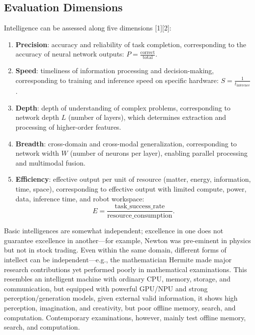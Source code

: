 \documentclass[12pt,a4paper]{article}
\begin{document}
\subsection{Evaluation Dimensions}
Intelligence can be assessed along five dimensions [1][2]:
\begin{enumerate}
\item \textbf{Precision}: accuracy and reliability of task completion, corresponding to the accuracy of neural network outputs: $P = \frac{\text{correct}}{\text{total}}$.
\item \textbf{Speed}: timeliness of information processing and decision-making, corresponding to training and inference speed on specific hardware: $S = \frac{1}{t_{\text{inference}}}$.
\item \textbf{Depth}: depth of understanding of complex problems, corresponding to network depth $L$ (number of layers), which determines extraction and processing of higher-order features.
\item \textbf{Breadth}: cross-domain and cross-modal generalization, corresponding to network width $W$ (number of neurons per layer), enabling parallel processing and multimodal fusion.
\item \textbf{Efficiency}: effective output per unit of resource (matter, energy, information, time, space), corresponding to effective output with limited compute, power, data, inference time, and robot workspace:
\[
E = \frac{\text{task\_success\_rate}}{\text{resource\_consumption}}.
\]
\end{enumerate}
Basic intelligences are somewhat independent; excellence in one does not guarantee excellence in another—for example, Newton was pre-eminent in physics but not in stock trading. Even within the same domain, different forms of intellect can be independent—e.g., the mathematician Hermite made major research contributions yet performed poorly in mathematical examinations. This resembles an intelligent machine with ordinary CPU, memory, storage, and communication, but equipped with powerful GPU/NPU and strong perception/generation models, given external valid information, it shows high perception, imagination, and creativity, but poor offline memory, search, and computation. Contemporary examinations, however, mainly test offline memory, search, and computation.
\end{document}
